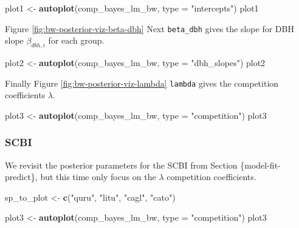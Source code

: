 \documentclass[12pt]{article}
\newenvironment{Shaded}{\begin{snugshade}}{\end{snugshade}}
\newcommand{\DataTypeTok}[1]{\textcolor[rgb]{0.13,0.29,0.53}{#1}}
\newcommand{\KeywordTok}[1]{\textcolor[rgb]{0.13,0.29,0.53}{\textbf{#1}}}
\newcommand{\NormalTok}[1]{#1}
\newcommand{\StringTok}[1]{\textcolor[rgb]{0.31,0.60,0.02}{#1}}
\begin{document}
\begin{Shaded}
\begin{Highlighting}[]
\NormalTok{plot1 <-}\StringTok{ }\KeywordTok{autoplot}\NormalTok{(comp_bayes_lm_bw, }\DataTypeTok{type =} \StringTok{"intercepts"}\NormalTok{)}
\NormalTok{plot1}
\end{Highlighting}
\end{Shaded}

Figure \ref{fig:bw-posterior-viz-beta-dbh} Next \texttt{beta\_dbh} gives
the slope for DBH slope \(\beta_{dbh,i}\) for each group.

\begin{Shaded}
\begin{Highlighting}[]
\NormalTok{plot2 <-}\StringTok{ }\KeywordTok{autoplot}\NormalTok{(comp_bayes_lm_bw, }\DataTypeTok{type =} \StringTok{"dbh_slopes"}\NormalTok{)}
\NormalTok{plot2}
\end{Highlighting}
\end{Shaded}

Finally Figure \ref{fig:bw-posterior-viz-lambda} \texttt{lambda} gives
the competition coefficients \(\lambda\).

\begin{Shaded}
\begin{Highlighting}[]
\NormalTok{plot3 <-}\StringTok{ }\KeywordTok{autoplot}\NormalTok{(comp_bayes_lm_bw, }\DataTypeTok{type =} \StringTok{"competition"}\NormalTok{)}
\NormalTok{plot3}
\end{Highlighting}
\end{Shaded}

\hypertarget{scbi-1}{%
\subsubsection{SCBI}\label{scbi-1}}

We revisit the posterior parameters for the SCBI from Section
\{model-fit-predict\}, but this time only focus on the \(\lambda\)
competition coefficients.

\begin{Shaded}
\begin{Highlighting}[]
\NormalTok{sp_to_plot <-}\StringTok{ }\KeywordTok{c}\NormalTok{(}\StringTok{"quru"}\NormalTok{, }\StringTok{"litu"}\NormalTok{, }\StringTok{"cagl"}\NormalTok{, }\StringTok{"cato"}\NormalTok{)}
\end{Highlighting}
\end{Shaded}

\begin{Shaded}
\begin{Highlighting}[]
\NormalTok{plot3 <-}\StringTok{ }\KeywordTok{autoplot}\NormalTok{(comp_bayes_lm_bw, }\DataTypeTok{type =} \StringTok{"competition"}\NormalTok{)}
\NormalTok{plot3}
\end{Highlighting}
\end{Shaded}
\end{document}

